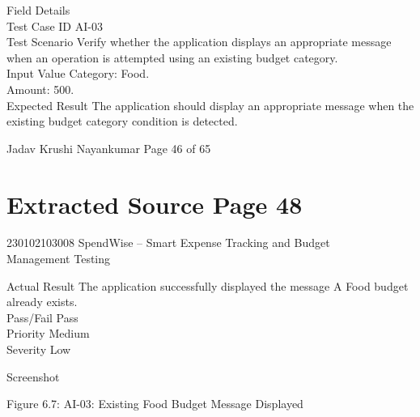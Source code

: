 \documentclass[12pt,a4paper]{report}
\begin{document}
\smallskip

\smallskip
Field                  Details\\ 
Test Case ID           AI-03\\ 
Test Scenario          Verify whether the application displays an appropriate message\\ 
when an operation is attempted using an existing budget category.\\ 
Input Value            Category: Food.\\ 
Amount: 500.\\ 
Expected Result        The application should display an appropriate message when the\\ 
existing budget category condition is detected.\\ 

\smallskip

\smallskip

\smallskip
Jadav Krushi Nayankumar                                                       Page 46 of 65\\ 

\clearpage
\section*{Extracted Source Page 48}
230102103008                          SpendWise – Smart Expense Tracking and Budget\\ 
Management Testing\\ 

\smallskip

\smallskip
Actual Result            The application successfully displayed the message A Food budget\\ 
already exists.\\ 
Pass/Fail                Pass\\ 
Priority                 Medium\\ 
Severity                 Low\\ 

\smallskip

\smallskip
Screenshot\\ 

\smallskip

\smallskip

\smallskip

\smallskip
Figure 6.7: AI-03: Existing Food Budget Message Displayed\\ 

\smallskip
\end{document}
